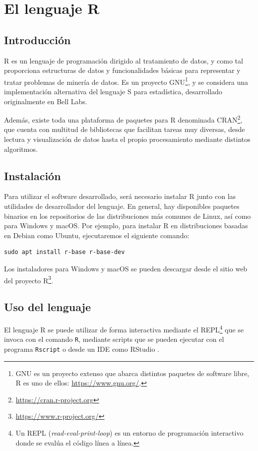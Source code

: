 \section{El lenguaje R}\label{introducciuxf3n-a-r}

\subsection{Introducción}

R \autocite{rlang} es un lenguaje de programación dirigido al tratamiento de datos, y
como tal proporciona estructuras de datos y funcionalidades básicas para
representar y tratar problemas de minería de datos. Es un proyecto GNU\footnote{GNU es un proyecto extenso que abarca distintos paquetes de software libre, R es uno de ellos: \url{https://www.gnu.org/}.}, y se considera una implementación alternativa del lenguaje S para estadística, desarrollado originalmente en Bell Labs.

Además, existe toda
una plataforma de paquetes para R denominada CRAN\footnote{\url{https://cran.r-project.org}}, que cuenta con
multitud de bibliotecas que facilitan tareas muy diversas, desde lectura y
visualización de datos hasta el propio procesamiento mediante distintos
algoritmos.

\subsection{Instalación}

Para utilizar el software desarrollado, será necesario instalar R junto con las utilidades de desarrollador del lenguaje. En general, hay disponibles paquetes binarios en los repositorios de las distribuciones más comunes de Linux, así como para Windows y macOS. Por ejemplo, para instalar R en distribuciones basadas en Debian como Ubuntu, ejecutaremos el siguiente comando:

\begin{verbatim}
sudo apt install r-base r-base-dev
\end{verbatim}

Los instaladores para Windows y macOS se pueden descargar desde el sitio web del proyecto R\footnote{\url{https://www.r-project.org/}}.

\subsection{Uso del lenguaje}

El lenguaje R se puede utilizar de forma interactiva mediante el REPL\footnote{Un REPL (\emph{read-eval-print-loop}) es un entorno de programación interactivo donde se evalúa el código línea a línea.} que se invoca con el comando \texttt{R}, mediante scripts que se pueden ejecutar con el programa \texttt{Rscript} o desde un IDE como RStudio \autocite{rstudio}.

